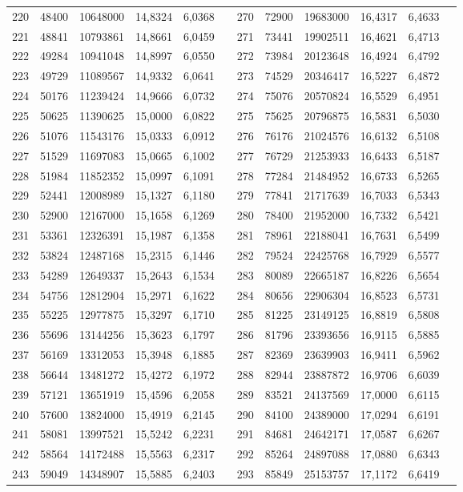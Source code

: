 \begin{longtable}{p{.17\linewidth}*{11}{S}}
220&48400&10648000&14,8324&6,0368&&270&72900&19683000&16,4317&6,4633\\
221&48841&10793861&14,8661&6,0459&&271&73441&19902511&16,4621&6,4713\\
222&49284&10941048&14,8997&6,0550&&272&73984&20123648&16,4924&6,4792\\
223&49729&11089567&14,9332&6,0641&&273&74529&20346417&16,5227&6,4872\\
224&50176&11239424&14,9666&6,0732&&274&75076&20570824&16,5529&6,4951\\
225&50625&11390625&15,0000&6,0822&&275&75625&20796875&16,5831&6,5030\\
226&51076&11543176&15,0333&6,0912&&276&76176&21024576&16,6132&6,5108\\
227&51529&11697083&15,0665&6,1002&&277&76729&21253933&16,6433&6,5187\\
228&51984&11852352&15,0997&6,1091&&278&77284&21484952&16,6733&6,5265\\
229&52441&12008989&15,1327&6,1180&&279&77841&21717639&16,7033&6,5343\\
230&52900&12167000&15,1658&6,1269&&280&78400&21952000&16,7332&6,5421\\
231&53361&12326391&15,1987&6,1358&&281&78961&22188041&16,7631&6,5499\\
232&53824&12487168&15,2315&6,1446&&282&79524&22425768&16,7929&6,5577\\
233&54289&12649337&15,2643&6,1534&&283&80089&22665187&16,8226&6,5654\\
234&54756&12812904&15,2971&6,1622&&284&80656&22906304&16,8523&6,5731\\
235&55225&12977875&15,3297&6,1710&&285&81225&23149125&16,8819&6,5808\\
236&55696&13144256&15,3623&6,1797&&286&81796&23393656&16,9115&6,5885\\
237&56169&13312053&15,3948&6,1885&&287&82369&23639903&16,9411&6,5962\\
238&56644&13481272&15,4272&6,1972&&288&82944&23887872&16,9706&6,6039\\
239&57121&13651919&15,4596&6,2058&&289&83521&24137569&17,0000&6,6115\\
240&57600&13824000&15,4919&6,2145&&290&84100&24389000&17,0294&6,6191\\
241&58081&13997521&15,5242&6,2231&&291&84681&24642171&17,0587&6,6267\\
242&58564&14172488&15,5563&6,2317&&292&85264&24897088&17,0880&6,6343\\
243&59049&14348907&15,5885&6,2403&&293&85849&25153757&17,1172&6,6419\\

\end{longtable}
